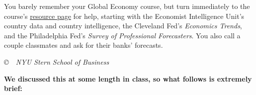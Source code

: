\documentclass[letterpaper,12pt]{article}
\begin{document}
You barely remember your Global Economy course, 
but turn immediately to the course's 
\href{http://www.stern.nyu.edu/eco/b012303/Backus/ge_resources_db.htm}
{resource page} for help,
starting with the Economist Intelligence Unit's country data and country 
intelligence, 
the Cleveland Fed's {\it Economics Trends\/}, 
and the Philadelphia Fed's 
{\it Survey of Professional Forecasters\/}.
You also call a couple classmates and ask for their banks' forecasts.  


\vfill \centerline{\it \copyright \ \number\year \ NYU Stern
School of Business}


\newpage
{\bf We  discussed this at some length in class, 
so what follows is extremely brief:  }  
\end{document}
